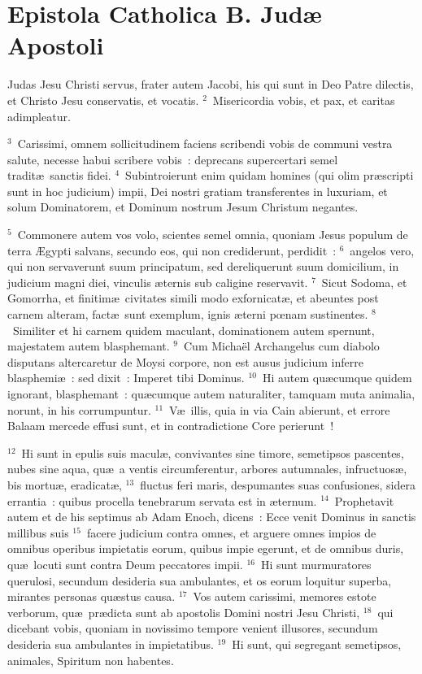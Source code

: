 {\centering \section*{Epistola Catholica B. Judæ Apostoli}}\thispagestyle{empty}

\noindent Judas Jesu Christi servus, frater autem Jacobi, his qui sunt in Deo Patre dilectis, et Christo Jesu conservatis, et vocatis.
${}^{2}$~Misericordia vobis, et pax, et caritas adimpleatur.


${}^{3}$~Carissimi, omnem sollicitudinem faciens scribendi vobis de communi vestra salute, necesse habui scribere vobis~: deprecans supercertari semel tradit\ae\ sanctis fidei.
${}^{4}$~Subintroierunt enim quidam homines (qui olim pr\ae scripti sunt in hoc judicium) impii, Dei nostri gratiam transferentes in luxuriam, et solum Dominatorem, et Dominum nostrum Jesum Christum negantes.


${}^{5}$~Commonere autem vos volo, scientes semel omnia, quoniam Jesus populum de terra \AE gypti salvans, secundo eos, qui non crediderunt, perdidit~:
${}^{6}$~angelos vero, qui non servaverunt suum principatum, sed dereliquerunt suum domicilium, in judicium magni diei, vinculis \ae ternis sub caligine reservavit.
${}^{7}$~Sicut Sodoma, et Gomorrha, et finitim\ae\ civitates simili modo exfornicat\ae , et abeuntes post carnem alteram, fact\ae\ sunt exemplum, ignis \ae terni pœnam sustinentes.
${}^{8}$~Similiter et hi carnem quidem maculant, dominationem autem spernunt, majestatem autem blasphemant.
${}^{9}$~Cum Micha\"el Archangelus cum diabolo disputans altercaretur de Moysi corpore, non est ausus judicium inferre blasphemi\ae~: sed dixit~: Imperet tibi Dominus.
${}^{10}$~Hi autem qu\ae cumque quidem ignorant, blasphemant~: qu\ae cumque autem naturaliter, tamquam muta animalia, norunt, in his corrumpuntur.
${}^{11}$~V\ae\ illis, quia in via Cain abierunt, et errore Balaam mercede effusi sunt, et in contradictione Core perierunt~!


${}^{12}$~Hi sunt in epulis suis macul\ae , convivantes sine timore, semetipsos pascentes, nubes sine aqua, qu\ae\ a ventis circumferentur, arbores autumnales, infructuos\ae , bis mortu\ae , eradicat\ae ,
${}^{13}$~fluctus feri maris, despumantes suas confusiones, sidera errantia~: quibus procella tenebrarum servata est in \ae ternum.
${}^{14}$~Prophetavit autem et de his septimus ab Adam Enoch, dicens~: Ecce venit Dominus in sanctis millibus suis
${}^{15}$~facere judicium contra omnes, et arguere omnes impios de omnibus operibus impietatis eorum, quibus impie egerunt, et de omnibus duris, qu\ae\ locuti sunt contra Deum peccatores impii.
${}^{16}$~Hi sunt murmuratores querulosi, secundum desideria sua ambulantes, et os eorum loquitur superba, mirantes personas qu\ae stus causa.
${}^{17}$~Vos autem carissimi, memores estote verborum, qu\ae\ pr\ae dicta sunt ab apostolis Domini nostri Jesu Christi,
${}^{18}$~qui dicebant vobis, quoniam in novissimo tempore venient illusores, secundum desideria sua ambulantes in impietatibus.
${}^{19}$~Hi sunt, qui segregant semetipsos, animales, Spiritum non habentes.


